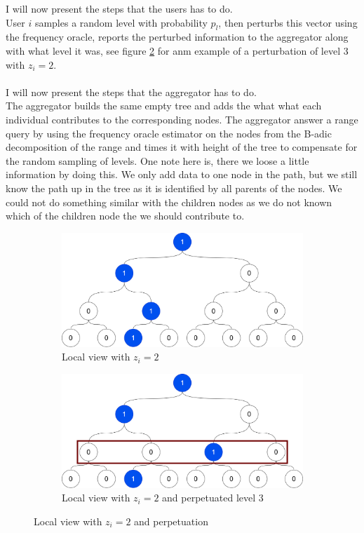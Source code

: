 \documentclass[11pt]{article}
\theoremstyle{definition}
\begin{document}
\noindent I will now present the steps that the users has to do. \\
User $i$ samples a random level with probability $p_l$, then 
perturbs this vector using the frequency oracle, reports the perturbed information to the aggregator along with what level it was, see figure \ref{fig:sub2} for anm example of a perturbation of level 3 with $z_i=2$. \\ \\
\noindent I will now present the steps that the aggregator has to do. \\
The aggregator builds the same empty tree and adds the what what each individual contributes to the corresponding nodes. The aggregator answer a range query by using the frequency oracle estimator on the nodes from the B-adic decomposition of the range and times it with height of the tree to compensate for the random sampling of levels. One note here is, there we loose a little information by doing this. We only add data to one node in the path, but we still know the path up in the tree as it is identified by all parents of the nodes. We could not do something similar with the children nodes as we do not known which of the children node the we should contribute to. 

\begin{figure}[H]
\centering
\begin{subfigure}{.5\textwidth}
  \centering
  \includegraphics[width=.8\linewidth]{figures/binary_tree_path_1.png}
  \caption{Local view with $z_i=2$}
  \label{fig:sub1}
\end{subfigure}%
\begin{subfigure}{.5\textwidth}
  \centering
  \includegraphics[width=.8\linewidth]{figures/binary_tree_path_1_sample.png}
  \caption{Local view with $z_i=2$ and perpetuated level 3}
  \label{fig:sub2}
\end{subfigure}
\caption{Local view with $z_i=2$ and perpetuation}
\label{fig:binary_tree}
\end{figure}
\end{document}
